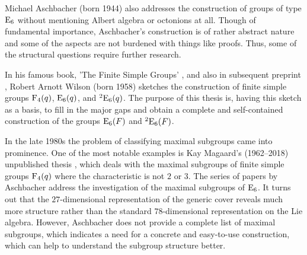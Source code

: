 Michael Aschbacher (born 1944) also addresses the 
construction of groups of type $\mathrm{E}_6$ without mentioning Albert
algebra or octonions at all. Though of fundamental importance,
Aschbacher's construction is of rather abstract nature and some
of the aspects are not burdened with things like proofs. Thus,
some of the structural questions require further research. 

In his famous book, 'The Finite Simple Groups' \cite{WilsonBook},
and also in subsequent preprint \cite{WilsonPaper},
Robert Arnott Wilson (born 1958) sketches the
construction of finite simple groups $\mathrm{F}_4(q)$, 
$\mathrm{E}_6(q)$, and ${}^2\mathrm{E}_6(q)$. The purpose of this thesis is,
having this sketch as a basis, to fill in the major gaps and 
obtain a complete and self-contained construction of the groups 
$\mathrm{E}_6(F)$ and ${}^2\mathrm{E}_6(F)$.

In the late 1980s the problem of classifying maximal subgroups 
came into prominence. One of the most notable examples is
Kay Magaard's (1962--2018) unpublished thesis \cite{Magaard}, which deals
with the maximal subgroups of finite simple groups $\mathrm{F}_4(q)$
where the characteristic is not $2$ or $3$. The series of papers by 
Aschbacher \cite{Asch1,Asch2,Asch3,Asch4} address the investigation
of the maximal subgroups of $\mathrm{E}_6$. It turns out that the $27$-dimensional
representation of the generic cover reveals much more structure rather 
than the standard $78$-dimensional representation on the Lie algebra.
However, Aschbacher does not provide a complete list of maximal subgroups, 
which indicates a need for a concrete and easy-to-use construction, which can
help to understand the subgroup structure better. 



